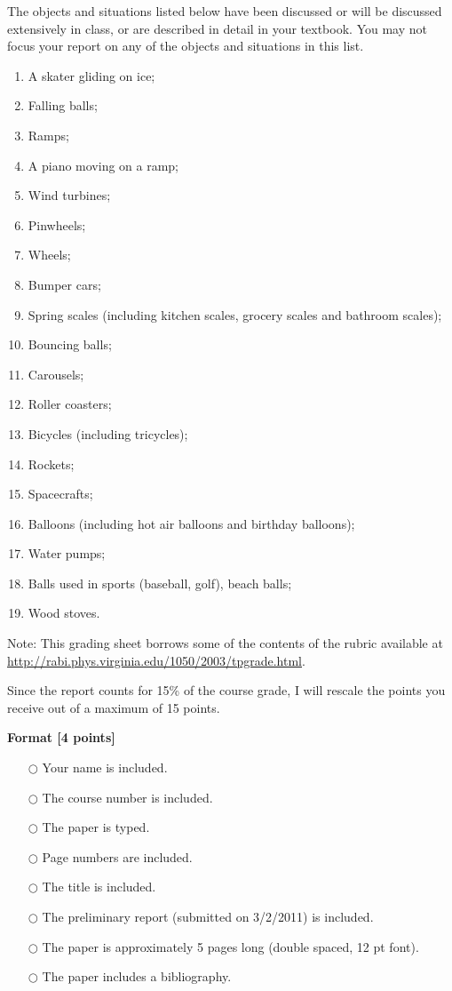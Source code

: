 \documentclass[12pt]{article}   %
\begin{document}
{}
The objects and situations  listed below have been discussed or will be discussed extensively in class, or are described in detail in your textbook. You may not focus your report on any of the objects and situations in this list.
\begin{enumerate}
\item A skater gliding on ice;
\item Falling balls;
\item Ramps;
\item A piano moving on a ramp;
\item Wind turbines;
\item Pinwheels;
\item Wheels;
\item Bumper cars;
\item Spring scales (including kitchen scales, grocery scales and bathroom scales);
\item Bouncing balls;
\item Carousels;
\item Roller coasters;
\item Bicycles (including tricycles);
\item Rockets;
\item Spacecrafts;
\item Balloons (including hot air balloons and birthday balloons);
\item Water pumps;
\item Balls used in sports (baseball, golf), beach balls;
\item Wood stoves.
\end{enumerate}

{}
\smallskip

Note: This grading sheet borrows some of the contents of the rubric available at \url{http://rabi.phys.virginia.edu/1050/2003/tpgrade.html}.
\smallskip

Since the report counts for 15\% of the course grade, I will rescale the points you receive out of a maximum of 15 points.
\smallskip

{\textbf{Format [4 points]}}
\begin{itemize}
\item[$\bigcirc$] Your name is included.
\item[$\bigcirc$] The course number is included.
\item[$\bigcirc$] The paper is typed.
\item[$\bigcirc$] Page numbers are included.
\item[$\bigcirc$] The title is included.
\item[$\bigcirc$] The preliminary report (submitted on 3/2/2011) is included.
\item[$\bigcirc$] The paper is approximately 5 pages long (double spaced, 12 pt font).
\item[$\bigcirc$] The paper includes a bibliography.
\end{itemize}
\smallskip
\end{document}
